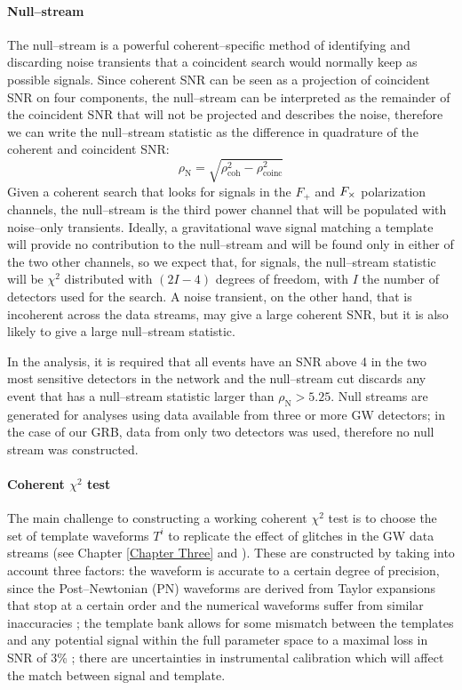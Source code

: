 \paragraph{Null--stream}
The null--stream is a powerful coherent--specific method of identifying and discarding noise transients that a coincident search would normally keep as possible signals. Since coherent SNR can be seen as a projection of coincident SNR on four components, the null--stream can be interpreted as the remainder of the coincident SNR that will not be projected and describes the noise, therefore we can write the null--stream statistic as the difference in quadrature of the coherent and coincident SNR:
%
\begin{equation}
\rho_{\mathrm{N}} = \sqrt{\rho_{\mathrm{coh}}^2 - \rho_{\mathrm{coinc}}^2}
\end{equation}
%
Given a coherent search that looks for signals in the $F_+$ and $F_{\times}$ polarization channels, the null--stream is the third power channel that will be populated with noise--only transients. Ideally, a gravitational wave signal matching a template will provide no contribution to the null--stream and will be found only in either of the two other channels, so we expect that, for signals, the null--stream statistic will be $\chi^{2}$ distributed with $(2I - 4)$ degrees of freedom, with $I$ the number of detectors used for the search. A noise transient, on the other hand, that is incoherent across the data streams, may give a large coherent \ac{SNR}, but it is also likely to give a large null--stream statistic.

In the analysis, it is required that all events have an \ac{SNR} above 4 in the two most sensitive detectors in the network and the null--stream cut discards any event that has a null--stream statistic larger than $\rho_{\mathrm{N}} > 5.25$. Null streams are generated for analyses using data available from three or more GW detectors; in the case of our GRB, data from only two detectors was used, therefore no null stream was constructed.

\paragraph{Coherent $\chi^2$ test}
The main challenge to constructing a working coherent $\chi^2$ test is to choose the set of template waveforms $T^i$ to replicate the effect of glitches in the \ac{GW} data streams (see Chapter \ref{Chapter Three} and \cite{Harry:2011qh}). These are constructed by taking into account three factors: the waveform is accurate to a certain degree of precision, since the Post--Newtonian (PN) waveforms are derived from Taylor expansions that stop at a certain order \cite{Bliving} and the numerical waveforms suffer from similar inaccuracies \cite{Hannam:2009hh}; the template bank allows for some mismatch between the templates and any potential signal within the full parameter space to a maximal loss in SNR of 3\% \cite{OwenSathyaprakash98}; there are uncertainties in instrumental calibration \cite{Abadie:2010px} which will affect the match between signal and template.


